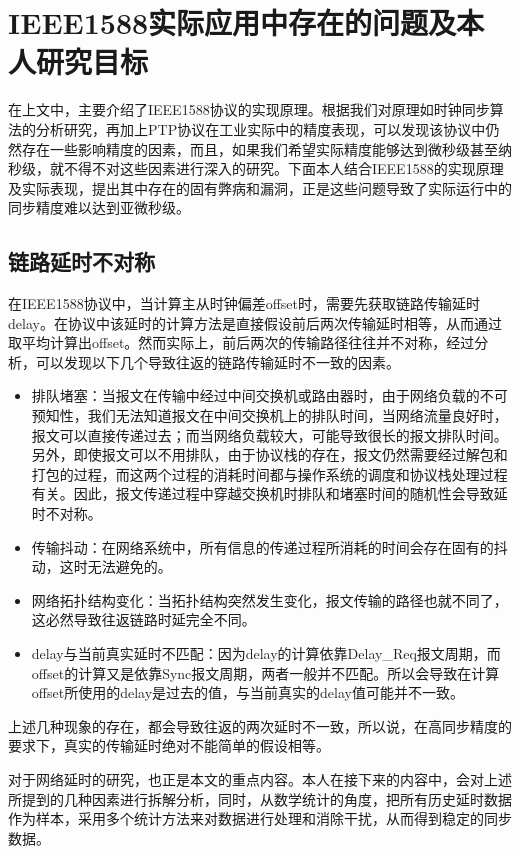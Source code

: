 \section{IEEE1588实际应用中存在的问题及本人研究目标}
在上文中，主要介绍了IEEE1588协议的实现原理。根据我们对原理如时钟同步算法的分析研究，再加上PTP协议在工业实际中的精度表现，可以发现该协议中仍然存在一些影响精度的因素，而且，如果我们希望实际精度能够达到微秒级甚至纳秒级，就不得不对这些因素进行深入的研究。下面本人结合IEEE1588的实现原理及实际表现，提出其中存在的固有弊病和漏洞，正是这些问题导致了实际运行中的同步精度难以达到亚微秒级。

\subsection{链路延时不对称}
\label{sec:1588_problem_1}
在IEEE1588协议中，当计算主从时钟偏差offset时，需要先获取链路传输延时delay。在协议中该延时的计算方法是直接假设前后两次传输延时相等，从而通过取平均计算出offset。然而实际上，前后两次的传输路径往往并不对称，经过分析，可以发现以下几个导致往返的链路传输延时不一致的因素。
\begin{itemize}[noitemsep,topsep=0pt,parsep=0pt,partopsep=0pt]
	\item 排队堵塞：当报文在传输中经过中间交换机或路由器时，由于网络负载的不可预知性，我们无法知道报文在中间交换机上的排队时间，当网络流量良好时，报文可以直接传递过去；而当网络负载较大，可能导致很长的报文排队时间。另外，即使报文可以不用排队，由于协议栈的存在，报文仍然需要经过解包和打包的过程，而这两个过程的消耗时间都与操作系统的调度和协议栈处理过程有关。因此，报文传递过程中穿越交换机时排队和堵塞时间的随机性会导致延时不对称。
	\item 传输抖动：在网络系统中，所有信息的传递过程所消耗的时间会存在固有的抖动，这时无法避免的。
	\item 网络拓扑结构变化：当拓扑结构突然发生变化，报文传输的路径也就不同了，这必然导致往返链路时延完全不同。
	\item delay与当前真实延时不匹配：因为delay的计算依靠Delay\_Req报文周期，而offset的计算又是依靠Sync报文周期，两者一般并不匹配。所以会导致在计算offset所使用的delay是过去的值，与当前真实的delay值可能并不一致。
\end{itemize}

上述几种现象的存在，都会导致往返的两次延时不一致，所以说，在高同步精度的要求下，真实的传输延时绝对不能简单的假设相等。

对于网络延时的研究，也正是本文的重点内容。本人在接下来的内容中，会对上述所提到的几种因素进行拆解分析，同时，从数学统计的角度，把所有历史延时数据作为样本，采用多个统计方法来对数据进行处理和消除干扰，从而得到稳定的同步数据。

